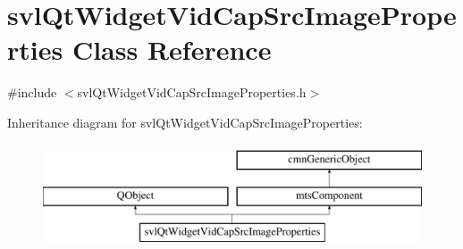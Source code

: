\hypertarget{classsvl_qt_widget_vid_cap_src_image_properties}{\section{svl\-Qt\-Widget\-Vid\-Cap\-Src\-Image\-Properties Class Reference}
\label{classsvl_qt_widget_vid_cap_src_image_properties}
}


{\ttfamily \#include $<$svl\-Qt\-Widget\-Vid\-Cap\-Src\-Image\-Properties.\-h$>$}

Inheritance diagram for svl\-Qt\-Widget\-Vid\-Cap\-Src\-Image\-Properties\-:\begin{figure}[H]
\begin{center}
\leavevmode
\includegraphics[height=3.000000cm]{d2/d5d/classsvl_qt_widget_vid_cap_src_image_properties}
\end{center}
\end{figure}
